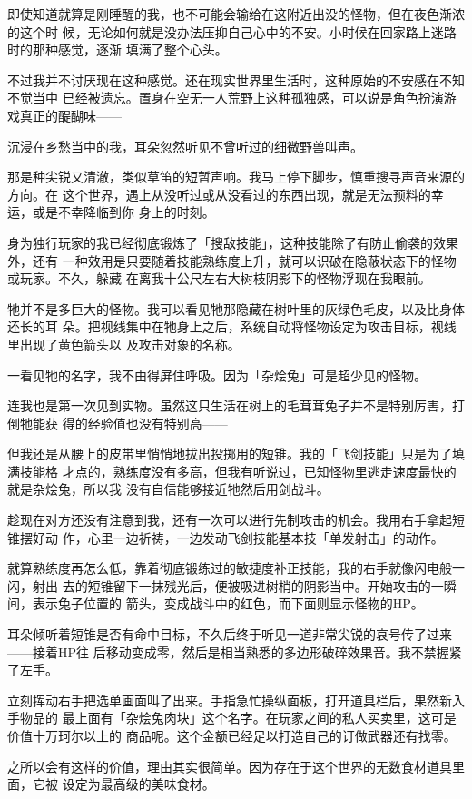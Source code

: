 \documentclass[11pt]{book}
\begin{document}
即使知道就算是刚睡醒的我，也不可能会输给在这附近出没的怪物，但在夜色渐浓的这个时
候，无论如何就是没办法压抑自己心中的不安。小时候在回家路上迷路时的那种感觉，逐渐
填满了整个心头。

不过我并不讨厌现在这种感觉。还在现实世界里生活时，这种原始的不安感在不知不觉当中
已经被遗忘。置身在空无一人荒野上这种孤独感，可以说是角色扮演游戏真正的醍醐味——

沉浸在乡愁当中的我，耳朵忽然听见不曾听过的细微野兽叫声。

那是种尖锐又清澈，类似草笛的短暂声响。我马上停下脚步，慎重搜寻声音来源的方向。在
这个世界，遇上从没听过或从没看过的东西出现，就是无法预料的幸运，或是不幸降临到你
身上的时刻。

身为独行玩家的我已经彻底锻炼了「搜敌技能」，这种技能除了有防止偷袭的效果外，还有
一种效用是只要随着技能熟练度上升，就可以识破在隐蔽状态下的怪物或玩家。不久，躲藏
在离我十公尺左右大树枝阴影下的怪物浮现在我眼前。

牠并不是多巨大的怪物。我可以看见牠那隐藏在树叶里的灰绿色毛皮，以及比身体还长的耳
朵。把视线集中在牠身上之后，系统自动将怪物设定为攻击目标，视线里出现了黄色箭头以
及攻击对象的名称。

一看见牠的名字，我不由得屏住呼吸。因为「杂烩兔」可是超少见的怪物。

连我也是第一次见到实物。虽然这只生活在树上的毛茸茸兔子并不是特别厉害，打倒牠能获
得的经验值也没有特别高——

但我还是从腰上的皮带里悄悄地拔出投掷用的短锥。我的「飞剑技能」只是为了填满技能格
才点的，熟练度没有多高，但我有听说过，已知怪物里逃走速度最快的就是杂烩兔，所以我
没有自信能够接近牠然后用剑战斗。

趁现在对方还没有注意到我，还有一次可以进行先制攻击的机会。我用右手拿起短锥摆好动
作，心里一边祈祷，一边发动飞剑技能基本技「单发射击」的动作。

就算熟练度再怎么低，靠着彻底锻练过的敏捷度补正技能，我的右手就像闪电般一闪，射出
去的短锥留下一抹残光后，便被吸进树梢的阴影当中。开始攻击的一瞬间，表示兔子位置的
箭头，变成战斗中的红色，而下面则显示怪物的HP。

耳朵倾听着短锥是否有命中目标，不久后终于听见一道非常尖锐的哀号传了过来——接着HP往
后移动变成零，然后是相当熟悉的多边形破碎效果音。我不禁握紧了左手。

立刻挥动右手把选单画面叫了出来。手指急忙操纵面板，打开道具栏后，果然新入手物品的
最上面有「杂烩兔肉块」这个名字。在玩家之间的私人买卖里，这可是价值十万珂尔以上的
商品呢。这个金额已经足以打造自己的订做武器还有找零。

之所以会有这样的价值，理由其实很简单。因为存在于这个世界的无数食材道具里面，它被
设定为最高级的美味食材。
\end{document}
